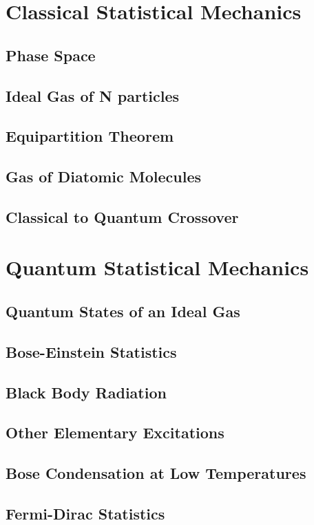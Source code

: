 \documentclass[a4paper]{article}
\theoremstyle{new}
\begin{document}
\newpage
\section{Classical Statistical Mechanics}
\subsection{Phase Space}
\subsection{Ideal Gas of N particles}
\subsection{Equipartition Theorem}
\subsection{Gas of Diatomic Molecules}
\subsection{Classical to Quantum Crossover}

\newpage
\section{Quantum Statistical Mechanics}
\subsection{Quantum States of an Ideal Gas}
\subsection{Bose-Einstein Statistics}
\subsection{Black Body Radiation}
\subsection{Other Elementary Excitations}
\subsection{Bose Condensation at Low Temperatures}
\subsection{Fermi-Dirac Statistics}
\end{document}
